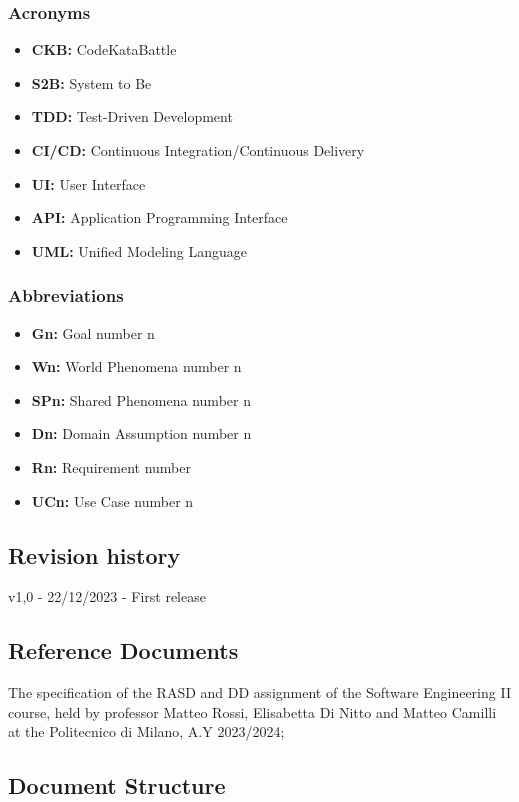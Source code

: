 \documentclass{article}
\begin{document}
\subsubsection{Acronyms}

\begin{itemize}
    \item \textbf{CKB:} CodeKataBattle
    \item \textbf{S2B:} System to Be
    \item \textbf{TDD:} Test-Driven Development
    \item \textbf{CI/CD:} Continuous Integration/Continuous Delivery
    \item \textbf{UI:} User Interface
    \item \textbf{API:} Application Programming Interface
    \item \textbf{UML:} Unified Modeling Language
\end{itemize}

\subsubsection{Abbreviations}

\begin{itemize}
    \item \textbf{Gn:} Goal number n
    \item \textbf{Wn:} World Phenomena number n
    \item \textbf{SPn:} Shared Phenomena number n
    \item \textbf{Dn:} Domain Assumption number n
    \item \textbf{Rn:} Requirement number 
    \item \textbf{UCn:} Use Case number n
\end{itemize}


\subsection{Revision history}
v1,0 - 22/12/2023 - First release
\subsection{Reference Documents}

The specification of the RASD and DD assignment of the Software
Engineering II course, held by professor Matteo Rossi, Elisabetta Di Nitto and
Matteo Camilli at the Politecnico di Milano, A.Y 2023/2024;

\subsection{Document Structure}
\end{document}
